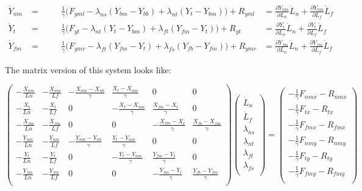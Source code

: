 \documentclass[
11pt, %
english, %
singlespacing, %
headsepline, %
chapterinoneline, %
]{MastersDoctoralThesis} %
\begin{document}
\begin{align}
  \dot{Y}_{nm} &= \hspace{1cm} \frac{1}{\gamma} \Big(F_{yml} - \lambda_{ns}(Y_{bm} - Y_{bb})
  + \lambda_{nt}(Y_{t } - Y_{bm}) \Big) + R_{yml}
  &= \frac{\partial Y_{nm}}{\partial L_n}\dot{L}_n + \frac{\partial Y_{nm}}{\partial L_f}\dot{L}_f\\
  \dot{Y}_{t}  &= \hspace{1cm} \frac{1}{\gamma} \Big(F_{yt } - \lambda_{nt}(Y_{t } - Y_{bm})
  + \lambda_{ft}(Y_{fm} - Y_{t }) \Big) + R_{yt }
  &= \frac{\partial Y_{t}}{\partial L_n}\dot{L}_n + \frac{\partial Y_{t}}{\partial L_f}\dot{L}_f\\
  \dot{Y}_{fm} &= \hspace{1cm} \frac{1}{\gamma} \Big(F_{ymr} - \lambda_{ft}(Y_{fm} - Y_{t })
  + \lambda_{fs}(Y_{fb} - Y_{fm}) \Big) + R_{ymr}
  &= \frac{\partial Y_{fm}}{\partial L_n}\dot{L}_n + \frac{\partial Y_{fm}}{\partial L_f}\dot{L}_f
\end{align}

The matrix version of this system looks like:

\[
\begin{pmatrix}
  -\frac{X_{nm}}{Ln} & -\frac{X_{nm}}{Lf}
  & -\frac{X_{nm}-X_{nb}}{\gamma} & \frac{X_{t}-X_{nm}}{\gamma} & 0 & 0\\
  -\frac{X_{t}}{Ln} & -\frac{X_{t}}{Lf}
  & 0 & -\frac{X_{t}-X_{nm}}{\gamma} & \frac{X_{fm}-X_{t}}{\gamma} & 0\\
  -\frac{X_{fm}}{Ln} & -\frac{X_{fm}}{Lf}
  & 0 & 0 & -\frac{X_{fm}-X_{t}}{\gamma} & \frac{X_{fb}-X_{fm}}{\gamma}\\
  -\frac{Y_{nm}}{Ln} & -\frac{Y_{nm}}{Lf}
  & -\frac{Y_{nm}-Y_{nb}}{\gamma} & \frac{Y_{t}-Y_{nm}}{\gamma} & 0 & 0\\
  -\frac{Y_{t}}{Ln} & -\frac{Y_{t}}{Lf}
  & 0 & -\frac{Y_{t}-Y_{nm}}{\gamma} & \frac{Y_{fm}-Y_{t}}{\gamma} & 0\\
  -\frac{Y_{fm}}{Ln} & -\frac{Y_{fm}}{Lf}
  & 0 & 0 & -\frac{Y_{fm}-Y_{t}}{\gamma} & \frac{Y_{fb}-Y_{fm}}{\gamma}\\
\end{pmatrix}
\begin{pmatrix}
  \dot{L}_n\\
  \dot{L}_f\\
  \lambda_{ns}\\
  \lambda_{nt}\\
  \lambda_{ft}\\
  \lambda_{fs}\\
\end{pmatrix}
=
\begin{pmatrix}
  -\frac{1}{\gamma}F_{nmx} - R_{nmx}\\
  -\frac{1}{\gamma}F_{tx}  - R_{tx}\\
  -\frac{1}{\gamma}F_{fmx} - R_{fmx}\\
  -\frac{1}{\gamma}F_{nmy} - R_{nmy}\\
  -\frac{1}{\gamma}F_{ty}  - R_{ty}\\
  -\frac{1}{\gamma}F_{fmy} - R_{fmy}\\
\end{pmatrix}
\]
\end{document}
